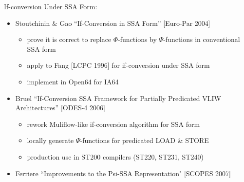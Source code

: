 If-conversion Under SSA Form:

\begin{itemize}

\item Stoutchinin \& Gao ``If-Conversion in SSA Form'' [Euro-Par 2004]
\begin{itemize}
\item prove it is correct to replace $\Phi$-functions by $\Psi$-functions
in conventional SSA form
\item apply to Fang [LCPC 1996] for if-conversion under SSA form
\item implement in Open64 for IA64
\end{itemize}

\item Bruel ``If-Conversion SSA Framework for Partially Predicated VLIW
Architectures'' [ODES-4 2006]
\begin{itemize}
\item rework Muliflow-like if-conversion algorithm for SSA form
\item locally generate $\Psi$-functions for predicated LOAD \& STORE
\item production use in ST200 compilers (ST220, ST231, ST240)
\end{itemize}

\item Ferriere ``Improvements to the Psi-SSA Representation" [SCOPES 2007]

\end{itemize}





